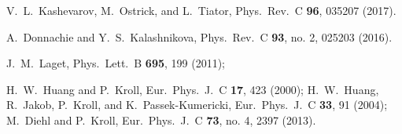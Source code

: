 \documentclass[aps,prc,twocolumn,floatfix,showpacs,preprintnumbers,amsmath,amssymb,superscriptaddress,linenumbers]{revtex4-1}
\begin{document}
\begin{thebibliography}{99}
  V.~L.~Kashevarov, M.~Ostrick, and L.~Tiator,
  Phys.\ Rev.\ C {\bf 96}, 035207 (2017).

  A.~Donnachie and Y.~S.~Kalashnikova,
  Phys.\ Rev.\ C {\bf 93}, no. 2, 025203 (2016).

   J.~M.~Laget,
  Phys.\ Lett.\ B {\bf 695}, 199 (2011);

  H.~W.~Huang and P.~Kroll,
  Eur.\ Phys.\ J.\ C {\bf 17}, 423 (2000);
  H.~W.~Huang, R.~Jakob, P.~Kroll, and K.~Passek-Kumericki,
  Eur.\ Phys.\ J.\ C {\bf 33}, 91 (2004);
  M.~Diehl and P.~Kroll,
  Eur.\ Phys.\ J.\ C {\bf 73}, no. 4, 2397 (2013).


\end{thebibliography}
\end{document}
